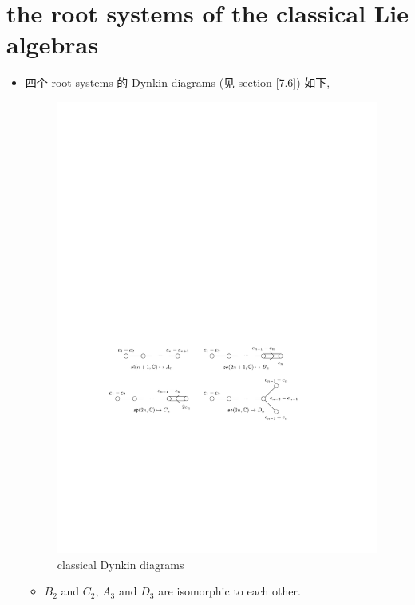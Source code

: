\section{the root systems of the classical Lie algebras} \label{6.7}
\begin{itemize}
	\item 四个 root systems 的 Dynkin diagrams (见 section \ref{7.6}) 如下,
	
	\begin{figure}[H]
		\centering
		\includegraphics[scale=1]{figures/classical Dynkin diagrams.pdf}
		\caption{classical Dynkin diagrams}
	\end{figure}
	
	\begin{itemize}
		\item $B_2$ and $C_2$, $A_3$ and $D_3$ are isomorphic to each other.
		

\end{itemize}
\end{itemize}
